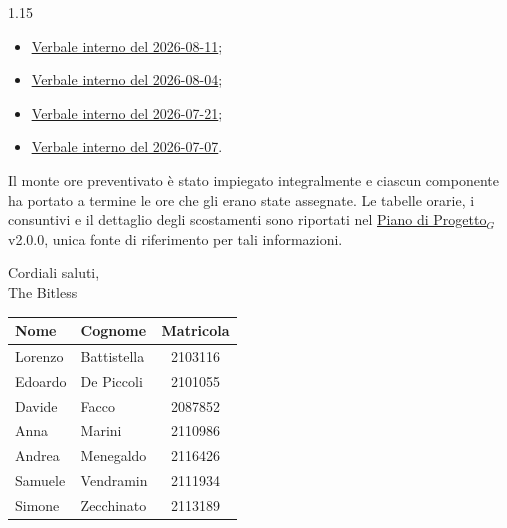 \documentclass[a4paper, 11pt]{article}
\let\orighref\href
\renewcommand{\href}[2]{\orighref{#1}{\uline{#2}}}
\newcommand{\versionePdP}{2.0.0}
\begin{document}
\begin{spacing}{1.15}
\begin{itemize}
\begin{itemize}
        \item \href{https://thebitless.live/PB/doc_interna/verbali/VI_2026-08-11_undicesimo-sprint/VI_2026-08-11_undicesimo-sprint.pdf}{Verbale interno del 2026-08-11};
        \item \href{https://thebitless.live/PB/doc_interna/verbali/VI_2026-08-04_decimo-sprint/VI_2026-08-04_decimo-sprint.pdf}{Verbale interno del 2026-08-04};
        \item \href{https://thebitless.live/PB/doc_interna/verbali/VI_2026-07-21_nono-sprint/VI_2026-07-21_nono-sprint.pdf}{Verbale interno del 2026-07-21};
        \item \href{https://thebitless.live/PB/doc_interna/verbali/VI_2026-07-07_ottavo-sprint/VI_2026-07-07_ottavo-sprint.pdf}{Verbale interno del 2026-07-07}.
    \end{itemize}
\end{itemize}

\vspace{0.2cm}

\noindent Il monte ore preventivato è stato impiegato integralmente e ciascun componente ha portato a termine le ore che gli erano state assegnate. Le tabelle orarie, i consuntivi e il dettaglio degli scostamenti sono riportati nel \href{https://thebitless.live/PB/doc_esterna/piano-di-progetto/piano-di-progetto.pdf}{Piano di Progetto$_G$} v\versionePdP, unica fonte di riferimento per tali informazioni.

\vspace{0.8cm}

\noindent Cordiali saluti, \\
The Bitless

\vspace{0.6cm}

\begin{center}
    \begin{tabular}{|l|l|c|}
        \hline
        \textbf{Nome} & \textbf{Cognome} & \textbf{Matricola} \\
        \hline
        Lorenzo & Battistella & 2103116 \\
        Edoardo & De Piccoli &  2101055 \\
        Davide & Facco &        2087852 \\
        Anna & Marini &         2110986 \\
        Andrea & Menegaldo &    2116426 \\
        Samuele & Vendramin &   2111934 \\
        Simone & Zecchinato &   2113189 \\
        \hline
    \end{tabular}
\end{center}

\end{spacing}
\end{document}

